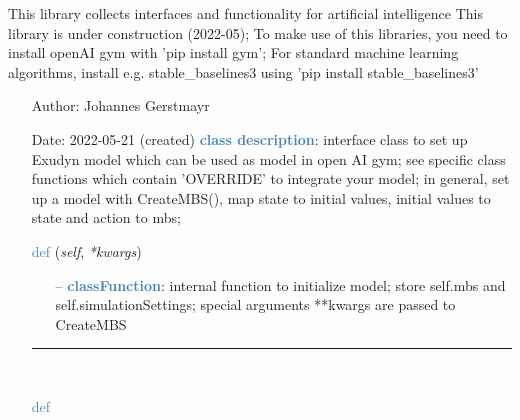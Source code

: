 
\label{sec:module:artificialIntelligence}
  This library collects interfaces and functionality for artificial intelligence
			This library is under construction (2022-05);
           To make use of this libraries, you need to install openAI gym with 'pip install gym';
           For standard machine learning algorithms, install e.g. stable\_baselines3 using 'pip install stable\_baselines3'
\begin{itemize}[leftmargin=1.4cm]
\setlength{\itemindent}{-1.4cm}
\item[]Author:    Johannes Gerstmayr
\item[]Date:      2022-05-21 (created)
\ei
{}
\noindent\textcolor{steelblue}{{\bf class description}}:  interface class to set up Exudyn model which can be used as model in open AI gym;
         see specific class functions which contain 'OVERRIDE' to integrate your model;
         in general, set up a model with CreateMBS(), map state to initial values, initial values to state and action to mbs;
\vspace{3pt} \\ 
\begin{flushleft}
\noindent \textcolor{steelblue}{def {\bf {}}}\label{sec:artificialIntelligence:OpenAIGymInterfaceEnv:__init__}
({\it self}, {\it **kwargs})
\end{flushleft}
\setlength{\itemindent}{0.7cm}
\begin{itemize}[leftmargin=0.7cm]
  \item[--]  \textcolor{steelblue}{\bf classFunction}: internal function to initialize model; store self.mbs and self.simulationSettings; special arguments **kwargs are passed to CreateMBS\vspace{12pt}\end{itemize}
%
\noindent\rule{8cm}{0.75pt}\vspace{1pt} \\ 
\begin{flushleft}
\noindent \textcolor{steelblue}{def {\bf {}}}\label{sec:artificialIntelligence:OpenAIGymInterfaceEnv:CreateMBS}

\end{flushleft}
\end{itemize}
